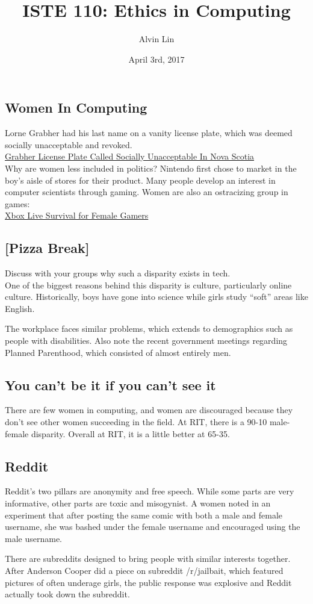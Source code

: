 \documentclass[letterpaper, 12pt]{article}
\title{ISTE 110: Ethics in Computing}
\author{Alvin Lin}
\date{April 3rd, 2017}
\begin{document}
\maketitle

\subsection*{Women In Computing}
Lorne Grabher had his last name on a vanity license plate, which was deemed
socially unacceptable and revoked. \\
\href{http://dailycaller.com/2017/03/25/grabher-license-plate-called-socially-unacceptable-in-nova-scotia/}{Grabher License Plate Called Socially Unacceptable In Nova Scotia} \\
Why are women less included in politics?
Nintendo first chose to market in the boy's aisle of stores for their product.
Many people develop an interest in computer scientists through gaming.
Women are also an ostracizing group in games: \\
\href{https://www.lifewire.com/xbox-live-survival-for-female-gamers-3562487}
{Xbox Live Survival for Female Gamers} \\

\subsection*{[Pizza Break]}
Discuss with your groups why such a disparity exists in tech. \\
One of the biggest reasons behind this disparity is culture, particularly
online culture. Historically, boys have gone into science while girls study
``soft'' areas like English. \par
The workplace faces similar problems, which extends to demographics such as
people with disabilities. Also note the recent government meetings regarding
Planned Parenthood, which consisted of almost entirely men.

\subsection*{You can't be it if you can't see it}
There are few women in computing, and women are discouraged because they don't
see other women succeeding in the field. At RIT, there is a 90-10 male-female
disparity. Overall at RIT, it is a little better at 65-35.

\subsection*{Reddit}
Reddit's two pillars are anonymity and free speech. While some parts are very
informative, other parts are toxic and misogynist. A women noted in an
experiment that after posting the same comic with both a male and female
username, she was bashed under the female username and encouraged using the
male username. \par
There are subreddits designed to bring people with similar interests together.
After Anderson Cooper did a piece on subreddit /r/jailbait, which featured
pictures of often underage girls, the public response was explosive and Reddit
actually took down the subreddit.
\end{document}
